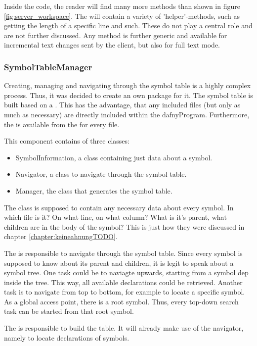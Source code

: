 Inside the code, the reader will find many more methods than shown in figure \ref{fig:server_workspace}. The  will contain a variety of 'helper'-methods, such as getting the length of a specific line and such. These do not play a central role and are not further discussed. Any  method is further generic and available for incremental text changes sent by the client, but also for full text mode.

\subsubsection{SymbolTableManager}
Creating, managing and navigating through the symbol table is a highly complex process.
Thus, it was decided to create an own package for it.
The symbol table is built based on a .
This has the advantage, that any included files (but only as much as necessary) are directly included within the dafnyProgram.
Furthermore, the  is available from the  for every file.

This component contains of three classes:
\begin{itemize}
    \item SymbolInformation, a class containing just data about a symbol.
    \item Navigator, a class to navigate through the symbol table.
    \item Manager, the class that generates the symbol table.
\end{itemize}

The  class is supposed to contain any necessary data about every symbol.
In which file is it? On what line, on what column? What is it's parent, what children are in the body of the symbol? This is just how they were discussed in chapter \ref{chapter:keineahnungTODO}.

The  is responsible to navigate through the symbol table.
Since every symbol is supposed to know about its parent and children, it is legit to speak about a symbol tree.
One task could be to naviagte upwards, starting from a symbol dep inside the tree.
This way, all available declarations could be retrieved.
Another task is to navigate from top to bottom, for example to locate a specific symbol.
As a global access point, there is a root symbol.
Thus, every top-down search task can be started from that root symbol.

The  is responsible to build the table.
It will already make use of the navigator, namely to locate declarations of symbols.

